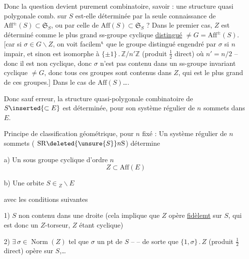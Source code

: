 Donc la question devient purement combinatoire, savoir : une structure quasi polygonale comb.  sur $S$ est-elle déterminée par la seule connaissance de $\mathrm{Aff}^{\pm}(S)\subset\mathfrak S_S$, ou par celle de $\mathrm{Aff}(S)\subset\mathfrak S_S$ ? Dans le premier cas, $Z$ est déterminé comme le plus grand ss-groupe cyclique \uline{distingué} $\neq G=\mathrm{Aff}^{\pm}(S)$. [car si $\sigma\in G\smallsetminus Z$, on voit facilem$^{\rm t}$ que
le groupe distingué  engendré par $\sigma$    si $n$ impair, et sinon    est isomorphe à $\{\pm1\}\mathbin{.}\mathbb Z/n'\mathbb Z$ (produit $\frac12$ direct) où $n'=n/2$ -- donc il est non cyclique, donc $\sigma$ n'est pas contenu dans un ss-groupe invariant cyclique $\neq G$, donc tous ces groupes sont contenus dans $Z$, qui est  le plus grand de ces groupes.] Dans le cas de $\mathrm{Aff}(S)$\ldots.

Donc sauf erreur, la structure quasi-polygonale combinatoire de $S\inserted{\subset E}$ est  déterminée, pour son système régulier de $n$ sommets dans $E$.

Principe de classification géométrique, pour $n$ fixé : Un système régulier de $n$ sommets ( $\mathrm{SR}\deleted{\unsure{S}}n\mathrm S$) détermine

a) Un sous groupe cyclique d'ordre $n$
\[
Z\subset\mathrm{Aff}(E)
\]

b) Une orbite $\displaystyle S\in {}_Z\!\backslash E$

avec les conditions suivantes

1) $S$ non contenu dans une droite (cela implique que $Z$ opère \uline{fidèlemt} sur $S$, qui est donc un $Z$-torseur, $Z$ étant cyclique)

2) $\exists\,\sigma\in\operatorname{Norm}(Z)$  tel que $\sigma$   un pt de $S$ --
 -- de sorte que $\{1,\sigma\}\mathbin{.}Z$ (produit $\frac12$ direct) opère sur $S$,\ldots {}

